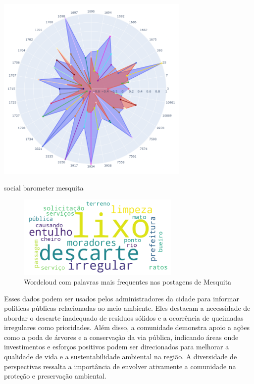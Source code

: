 \begin{quadro}[htb]
	\centering
	\includegraphics[width=0.7\textwidth]{images/social_barometer_mesquita.png}
	\caption{social barometer mesquita}
	\label{fig:social_barometer_mesquita}
\end{quadro}

\begin{figure}[htb]
	\centering
	\includegraphics[width=0.7\textwidth]{images/wordcloud_mesquita.png}
	\caption{Wordcloud com palavras mais frequentes nas postagens de Mesquita}
	\label{fig:wordcloud_mesquita}
\end{figure}

Esses dados podem ser usados pelos administradores da cidade para informar políticas públicas relacionadas ao meio ambiente. Eles destacam a necessidade de abordar o descarte inadequado de resíduos sólidos e a ocorrência de queimadas irregulares como prioridades. Além disso, a comunidade demonstra apoio a ações como a poda de árvores e a conservação da via pública, indicando áreas onde investimentos e esforços positivos podem ser direcionados para melhorar a qualidade de vida e a sustentabilidade ambiental na região. A diversidade de perspectivas ressalta a importância de envolver ativamente a comunidade na proteção e preservação ambiental.

